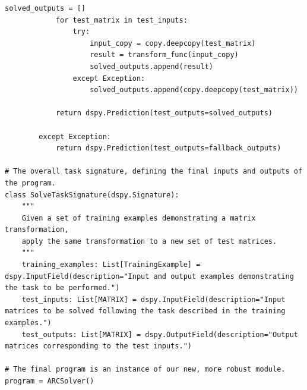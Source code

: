 \begin{instructbox}
\begin{lstlisting}[breakindent=0pt, breaklines=true, breakatwhitespace=true, frame=single, backgroundcolor=\color{blue!10}]
            solved_outputs = []
            for test_matrix in test_inputs:
                try:
                    input_copy = copy.deepcopy(test_matrix)
                    result = transform_func(input_copy)
                    solved_outputs.append(result)
                except Exception:
                    solved_outputs.append(copy.deepcopy(test_matrix))
            
            return dspy.Prediction(test_outputs=solved_outputs)

        except Exception:
            return dspy.Prediction(test_outputs=fallback_outputs)

# The overall task signature, defining the final inputs and outputs of the program.
class SolveTaskSignature(dspy.Signature):
    """
    Given a set of training examples demonstrating a matrix transformation,
    apply the same transformation to a new set of test matrices.
    """
    training_examples: List[TrainingExample] = dspy.InputField(description="Input and output examples demonstrating the task to be performed.")
    test_inputs: List[MATRIX] = dspy.InputField(description="Input matrices to be solved following the task described in the training examples.")
    test_outputs: List[MATRIX] = dspy.OutputField(description="Output matrices corresponding to the test inputs.")

# The final program is an instance of our new, more robust module.
program = ARCSolver()
\end{lstlisting}
\end{instructbox}